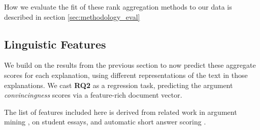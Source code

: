 \documentclass[notitlepage,12pt]{jedm}
\begin{document}
How we evaluate the fit of these rank aggregation methods to our data is 
described in section \ref{sec:methodology_eval}

\subsection{Linguistic Features}\label{sec:features}
We build on the results from the previous section to now predict these 
aggregate scores for each explanation, using different representations of the 
text in those explanations.
We cast \textbf{RQ2} as a regression task, predicting the argument 
\textit{convincingness} scores via a feature-rich document vector.

The list of features included here is derived from related work in argument 
mining \cite{habernal_which_2016,persing_end--end_2016}, on student 
essays, and automatic short answer scoring \cite{mohler_text--text_2009}.
\end{document}
